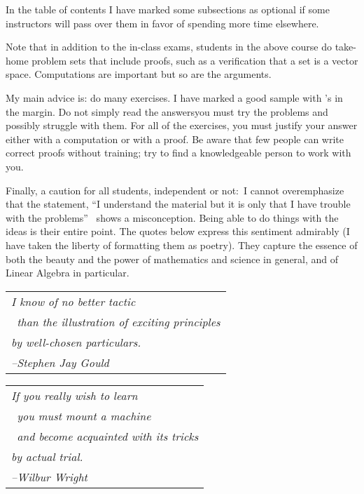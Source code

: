 {In the table of contents
I have marked some subsections as optional if
some instructors will pass over them in favor of spending more time elsewhere. 

Note that 
in addition to the in-class exams,
students in the above course do 
take-home problem sets that include proofs, such as a verification
that a set is a vector space.
Computations are important but so are the arguments.

My main advice is: do many exercises.
I have marked a good sample with \recommendationmark's in the margin.
Do not simply read the answers\Dash you must
try the problems and possibly struggle with them.
For all of the exercises, you must justify your answer either with a computation
or with a proof.
Be aware that few people can write correct proofs without training;
try to find a knowledgeable person to work with you.

Finally, a caution for all students, independent or not:~I 
cannot overemphasize that the 
statement, ``I understand the material but it is only 
that I have trouble with the problems''\ %
shows a misconception.
Being able to do things with the ideas is their entire point.
The quotes below express this sentiment admirably
(I have taken the liberty of formatting them as poetry).
They capture the essence of both the beauty and the power
of mathematics and science in general, 
and of Linear Algebra in particular.

\bigskip
\par\noindent\begin{tabular}[t]{@{}l@{}}
  \textit{I know of no better tactic}                     \\
  \textit{\ than the illustration of exciting principles} \\
  \textit{by well-chosen particulars.}                    \\
  \hspace*{1in}\textit{--Stephen Jay Gould}
\end{tabular}

\bigskip
\par\noindent
\begin{tabular}[t]{@{}l@{}}   
\textit{If you really wish to learn}                     \\
   \textit{\ you must mount a machine}  \\ 
   \textit{\ and become acquainted with its tricks} \\
   \textit{by actual trial.}                    \\
   \hspace*{1in}\textit{--Wilbur Wright}
\end{tabular}

}
